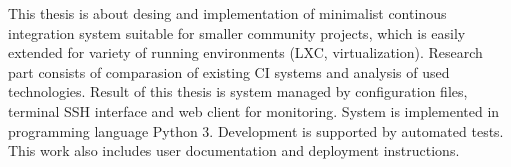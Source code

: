 This thesis is about desing and implementation of minimalist continous integration system suitable for smaller community projects, which is easily extended for variety of running environments (LXC, virtualization).
Research part consists of comparasion of existing CI systems and analysis of used technologies.
Result of this thesis is system managed by configuration files, terminal SSH interface and web client for monitoring.
System is implemented in programming language Python 3.
Development is supported by automated tests.
This work also includes user documentation and deployment instructions.